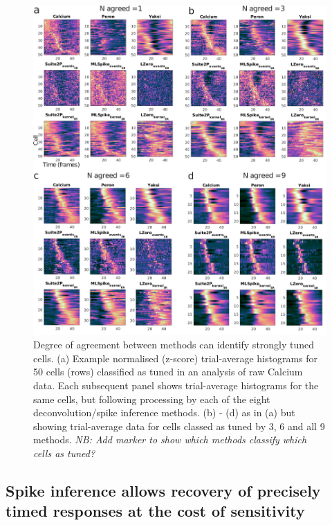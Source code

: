 \documentclass[a4paper,10pt,twocolumn]{article}
\begin{document}
\begin{figure}
\includegraphics[width=\textwidth]{full_figs_19v2/why_deconvolve_F5_19v2.png}
\caption{\label{fig:tuned_cells_psth}Degree of agreement between methods can identify strongly tuned cells. (a) Example normalised (z-score) trial-average histograms for 50 cells (rows) classified as tuned in an analysis of raw Calcium data. Each subsequent panel shows trial-average histograms for the same cells, but following processing by each of the eight deconvolution/spike inference methods. (b) - (d) as in (a) but showing trial-average data for cells classed as tuned by 3, 6 and all 9 methods. \emph{NB: Add marker to show which methods classify which cells as tuned?}}
\end{figure}


\subsection{Spike inference allows recovery of precisely timed responses at the cost of sensitivity}
\end{document}
